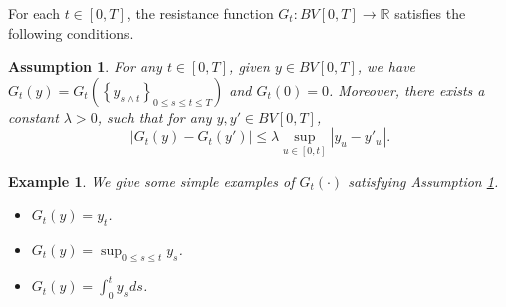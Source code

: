 \documentclass[10pt]{article}%
\numberwithin{equation}{section}
\newtheorem{example}[theorem]{Example}
\newtheorem{assumption}[theorem]{Assumption}
\begin{document}
For each $t\in[0,T]$, the resistance function $G_t:  BV[0,T]\rightarrow \mathbb{R}$ satisfies the following conditions.
\begin{assumption}\label{assgk}
For any $t\in[0,T]$, given $y\in BV[0,T]$,  we have $G_{t}(y)=G_{t}\left ( \left \{ y_{s\wedge t} \right \}_{0\le s\le t\le T}  \right ) $ and  $G_t(0)=0$. Moreover, there exists a constant $\lambda>0$, such that for any $y,y'\in BV[0,T]$,   $$\left | G_{t}(y)-G_t(y') \right | \leq \lambda \sup _{u\in[0,t]}\left | y_u-y'_{u} \right |.$$
\end{assumption}

\begin{example}
  We give some simple  examples of  $G_t(\cdot)$ satisfying Assumption \ref{assgk}.

  \begin{itemize}
      \item[(i)] $G_t(y)=y_t$.
      \item[(ii)] $G_t(y)=\sup_{0\leq s\leq t}y_s$.
      \item[(iii)] $G_{t}(y)=\int_{0}^{t}y_sds$.
  \end{itemize}
\end{example}
\end{document}

